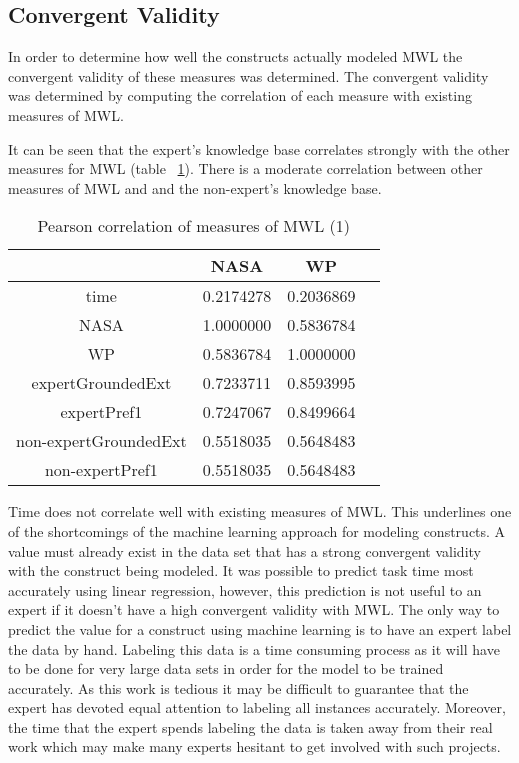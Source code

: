 \subsection{Convergent Validity}

In order to determine how well the constructs actually modeled MWL the convergent validity of these measures was determined. The convergent validity was determined by computing the correlation of each measure with existing measures of MWL. 

It can be seen that the expert's knowledge base correlates strongly with the other measures for MWL (table ~\ref{tab:corrmwlone}). There is a moderate correlation between other measures of MWL and and the non-expert's knowledge base. 

\begin{table}[!htbp]
\centering
\begin{tabular}{|c|c|c|c|}
\hline
                & NASA      &  WP        \\ \hline
time             & 0.2174278 & 0.2036869  \\
NASA             & 1.0000000 & 0.5836784 \\
WP               & 0.5836784 & 1.0000000 \\
expertGroundedExt  & 0.7233711 & 0.8593995 \\
expertPref1        & 0.7247067 & 0.8499664 \\
non-expertGroundedExt & 0.5518035 & 0.5648483 \\
non-expertPref1       & 0.5518035 & 0.5648483 \\
\hline
\end{tabular}
\caption{Pearson correlation of measures of MWL (1)}
\label{tab:corrmwlone}
\end{table}

Time does not correlate well with existing measures of MWL. This underlines one of the shortcomings of the machine learning approach for modeling constructs. A value must already exist in the data set that has a strong convergent validity with the construct being modeled. It was possible to predict task time most accurately using linear regression, however, this prediction is not useful to an expert if it doesn't have a high convergent validity with MWL. The only way to predict the value for a construct using machine learning is to have an expert label the data by hand. Labeling this data is a time consuming process as it will have to be done for very large data sets in order for the model to be trained accurately. As this work is tedious it may be difficult to guarantee that the expert has devoted equal attention to labeling all instances accurately. Moreover, the time that the expert spends labeling the data is taken away from their real work which may make many experts hesitant to get involved with such projects.


